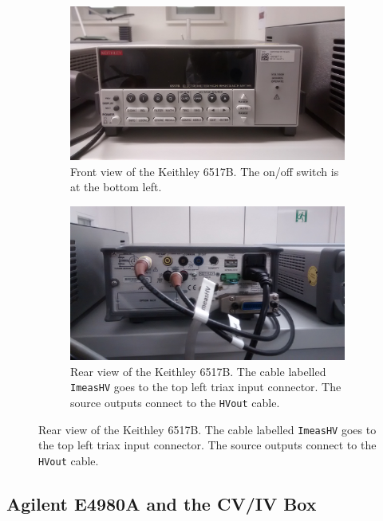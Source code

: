 \documentclass[a4paper]{article}
\begin{document}
\begin{figure}[hbtp]
\centering
\begin{subfigure}[t]{0.475\textwidth}
\centering\captionsetup{width=.8\linewidth}%
\includegraphics[width=\linewidth]{pictures/front_keithley65.jpg}
\caption[Front View of the Keithley 6517B]{Front view of the Keithley 6517B. The on/off switch is at the bottom left.}
\label{fig:keithley6517bfront}
\end{subfigure}
\begin{subfigure}[t]{0.475\textwidth}
\centering\captionsetup{width=.8\linewidth}%
\includegraphics[width=\linewidth]{pictures/back_keithley65.jpg}
\caption[Back View of the Keithley 6517B]{Rear view of the Keithley 6517B. The cable labelled {\tt ImeasHV} goes to the top left triax input connector. The source outputs connect to the {\tt HVout} cable.}
\label{fig:keithley6517bback}
\end{subfigure}
\end{figure}

\subsection{Agilent E4980A and the CV/IV Box}
\label{sec:agilent}
\end{document}
